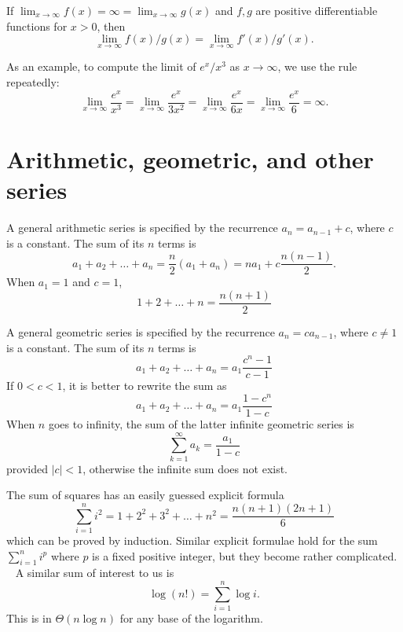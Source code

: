 \begin{Theorem}
If $\lim_{x\to \infty} f(x) = \infty = \lim_{x\to
\infty} g(x)$ and $f, g$ are positive differentiable functions for $x>0$,
then $$\lim_{x\to\infty} f(x)/g(x) = \lim_{x\to\infty} f'(x)/g'(x).$$
\end{Theorem}

As an example, to compute the limit of $e^x/x^3$ as $x\to \infty$, we use 
the rule repeatedly:
$$
\lim_{x\to\infty} \frac{e^x}{x^3} = \lim_{x\to\infty} \frac{e^x}{3x^2} = 
\lim_{x\to\infty} \frac{e^x}{6x} = \lim_{x\to\infty} \frac{e^x}{6} = \infty.
$$

\section{Arithmetic, geometric, and other series}
\label{sec:app:sum:series}

A general arithmetic series is specified by the recurrence
\(a_n = a_{n-1} + c\), where \(c\) is a constant. The sum of
its \(n\) terms is
\[
a_{1}+a_{2}+\ldots+a_{n} = \frac{n}{2}(a_1 + a_n ) =
na_1 + c\frac{n(n-1)}{2}.
\] 
When \(a_1=1\) and \(c=1\), 
\[
1 + 2 + \dots + n = \frac{n(n+1)}{2}
\]

A general geometric series is specified by the recurrence
\(a_n = ca_{n-1}\), where \(c \ne 1\) is a constant. The
sum of its \(n\) terms is
\[
a_{1}+a_{2}+\ldots+a_{n} = a_1 \frac{c^n - 1}{c - 1}
\]
If \(0 < c < 1\), it is better to rewrite the sum as
\[
a_{1}+a_{2}+\ldots+a_{n} = a_1 \frac{1 - c^n}{1-c}
\]
When \(n\) goes to infinity, the sum of the latter
infinite geometric series is
\[
\sum\limits_{k=1}^{\infty}a_k = \frac{a_1}{1-c}
\]
provided $|c| < 1$, otherwise the infinite sum does not exist.

The sum of squares has an easily guessed explicit formula
\[
\sum_{i=1}^n i^2 = 1 + 2^2 + 3^2 + \ldots + n^2 = \frac{n(n+1)(2n+1)}{6}
\]
which can be proved by induction.
Similar explicit formulae hold for the sum $\sum_{i=1}^n i^p$ where $p$
is a fixed positive integer, but they become rather complicated. \
%
A similar sum of interest to us is $$\log(n!) = \sum_{i=1}^n \log
i.$$ This is in $\Theta(n\log n)$ for any base of the logarithm.



